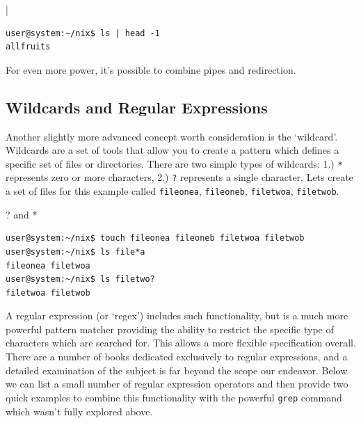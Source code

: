 \documentclass[11pt]{article}
\begin{document}
\begin{listing}[H]
\caption{|}\vspace{-0.1in}
\begin{verbatim}
user@system:~/nix$ ls | head -1
allfruits
\end{verbatim}
\end{listing}

For even more power, it's possible to combine pipes and redirection.
\subsection{Wildcards and Regular Expressions}

Another slightly more advanced concept worth consideration is the `wildcard'.  Wildcards are a set of tools that allow you to create a pattern which defines a specific set of files or directories. There are two simple types of wildcards: 1.) \texttt{*} represents zero or more characters, 2.) \texttt{?} represents a single character. Lets create a set of files for this example called \texttt{fileonea}, \texttt{fileoneb}, \texttt{filetwoa}, \texttt{filetwob}.\\

\begin{listing}[H]
\caption{? and *}\vspace{-0.1in}
\begin{verbatim}
user@system:~/nix$ touch fileonea fileoneb filetwoa filetwob
user@system:~/nix$ ls file*a
fileonea filetwoa
user@system:~/nix$ ls filetwo?
filetwoa filetwob
\end{verbatim}
\end{listing}

A regular expression (or `regex') includes such functionality, but is a much more powerful pattern matcher providing the ability to restrict the specific type of characters which are searched for. This allows a more flexible specification overall. There are a number of books dedicated exclusively to regular expressions, and a detailed examination of the subject is far beyond the scope our endeavor. Below we can list a small number of regular expression operators and then provide two quick examples to combine this functionality with the powerful \texttt{grep} command which wasn't fully explored above.
\end{document}

